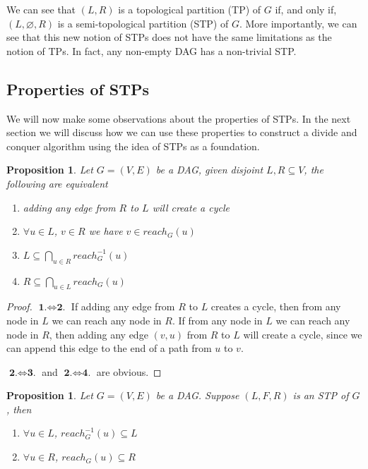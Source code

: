 \documentclass{report}
\newtheorem{proposition}[theorem]{Proposition}
\begin{document}
We can see that $(L,R)$ is a topological partition (TP) of $G$ if, and only if, $(L,\varnothing,R)$ is a semi-topological partition (STP) of $G$. More importantly, we can see that this new notion of STPs does not have the same limitations as the notion of TPs. In fact, any non-empty DAG has a non-trivial STP.

\subsection{Properties of STPs}

We will now make some observations about the properties of STPs. In the next section we will discuss how we can use these properties to construct a divide and conquer algorithm using the idea of STPs as a foundation.

\begin{proposition}
Let $G=(V,E)$ be a DAG, given disjoint $L,R \subseteq V$, the following are equivalent
\begin{enumerate}
\item adding any edge from $R$ to $L$ will create a cycle
\item $\forall u \in L$, $v \in R$ we have $v \in reach_{G}(u)$
\item $L \subseteq \bigcap_{u \in R} reach_{G}^{-1}(u)$
\item $R \subseteq \bigcap_{u \in L} reach_{G}(u)$
\end{enumerate}
\end{proposition}

\begin{proof}
$\textbf{1.} \Leftrightarrow \textbf{2.}$ If adding any edge from $R$ to $L$ creates a cycle, then from any node in $L$ we can reach any node in $R$. If from any node in $L$ we can reach any node in $R$, then adding any edge $(v,u)$ from $R$ to $L$ will create a cycle, since we can append this edge to the end of a path from $u$ to $v$.

$\textbf{2.} \Leftrightarrow \textbf{3.}$ and $\textbf{2.} \Leftrightarrow \textbf{4.}$ are obvious.
\end{proof}

\begin{proposition}
Let $G=(V,E)$ be a DAG. Suppose $(L,F,R)$ is an STP of $G$, then
\begin{enumerate}
\item $\forall u \in L$, $reach_{G}^{-1}(u) \subseteq L$
\item $\forall u \in R$, $reach_{G}(u) \subseteq R$
\end{enumerate}
\end{proposition}
\end{document}
